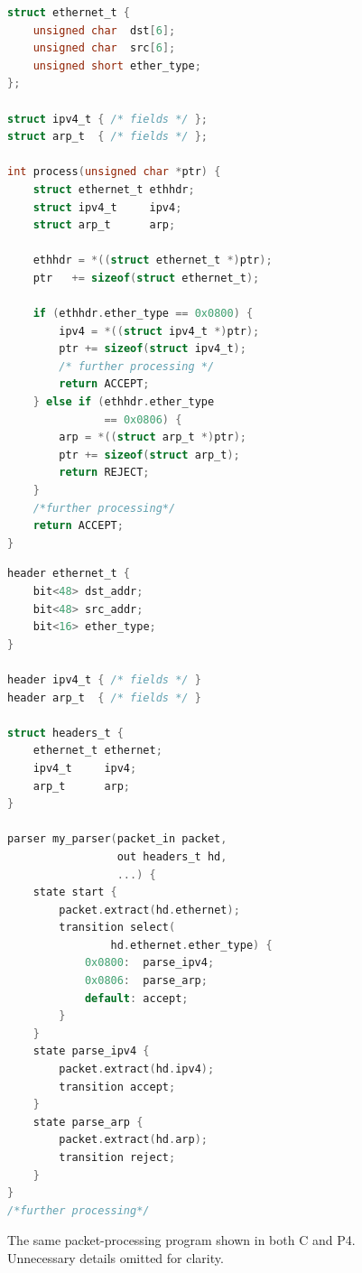 \begin{figure}[H]
\centering
\begin{minipage}[b]{0.47\textwidth}
\begin{lstlisting}[style=codeside, language=C]
struct ethernet_t {
    unsigned char  dst[6];
    unsigned char  src[6];
    unsigned short ether_type;
};

struct ipv4_t { /* fields */ };
struct arp_t  { /* fields */ };

int process(unsigned char *ptr) {
    struct ethernet_t ethhdr;
    struct ipv4_t     ipv4;
    struct arp_t      arp;

    ethhdr = *((struct ethernet_t *)ptr);
    ptr   += sizeof(struct ethernet_t);

    if (ethhdr.ether_type == 0x0800) {
        ipv4 = *((struct ipv4_t *)ptr);
        ptr += sizeof(struct ipv4_t);
        /* further processing */
        return ACCEPT;
    } else if (ethhdr.ether_type
               == 0x0806) {
        arp = *((struct arp_t *)ptr);
        ptr += sizeof(struct arp_t);
        return REJECT;
    }
    /*further processing*/
    return ACCEPT;
}
\end{lstlisting}
\label{lst:c-parser}
\end{minipage}\hfill
\begin{minipage}[b]{0.47\textwidth}
\begin{lstlisting}[style=codeside, language=C]
header ethernet_t {
    bit<48> dst_addr;
    bit<48> src_addr;
    bit<16> ether_type;
}

header ipv4_t { /* fields */ }
header arp_t  { /* fields */ }

struct headers_t {
    ethernet_t ethernet;
    ipv4_t     ipv4;
    arp_t      arp;
}

parser my_parser(packet_in packet,
                 out headers_t hd,
                 ...) {
    state start {
        packet.extract(hd.ethernet);
        transition select(
                hd.ethernet.ether_type) {
            0x0800:  parse_ipv4;
            0x0806:  parse_arp;
            default: accept;
        }
    }
    state parse_ipv4 {
        packet.extract(hd.ipv4);
        transition accept;
    }
    state parse_arp {
        packet.extract(hd.arp);
        transition reject;
    }
}
/*further processing*/
\end{lstlisting}
\label{lst:p4-parser}
\end{minipage}
\caption{The same packet-processing program shown in both C and P4. Unnecessary details omitted for clarity.}
\label{fig:c-vs-p4}
\end{figure}


